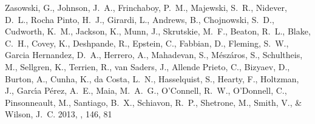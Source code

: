 \documentclass[12pt, preprint]{aastex}
\begin{document}
\begin{thebibliography}{24}
{Zasowski}, G., {Johnson}, J.~A., {Frinchaboy}, P.~M., {Majewski}, S.~R.,
  {Nidever}, D.~L., {Rocha Pinto}, H.~J., {Girardi}, L., {Andrews}, B.,
  {Chojnowski}, S.~D., {Cudworth}, K.~M., {Jackson}, K., {Munn}, J.,
  {Skrutskie}, M.~F., {Beaton}, R.~L., {Blake}, C.~H., {Covey}, K.,
  {Deshpande}, R., {Epstein}, C., {Fabbian}, D., {Fleming}, S.~W., {Garcia
  Hernandez}, D.~A., {Herrero}, A., {Mahadevan}, S., {M{\'e}sz{\'a}ros}, S.,
  {Schultheis}, M., {Sellgren}, K., {Terrien}, R., {van Saders}, J., {Allende
  Prieto}, C., {Bizyaev}, D., {Burton}, A., {Cunha}, K., {da Costa}, L.~N.,
  {Hasselquist}, S., {Hearty}, F., {Holtzman}, J., {Garc{\'{\i}}a P{\'e}rez},
  A.~E., {Maia}, M.~A.~G., {O'Connell}, R.~W., {O'Donnell}, C., {Pinsonneault},
  M., {Santiago}, B.~X., {Schiavon}, R.~P., {Shetrone}, M., {Smith}, V., \&
  {Wilson}, J.~C. 2013, \aj, 146, 81

\end{thebibliography}

%
\end{document}
